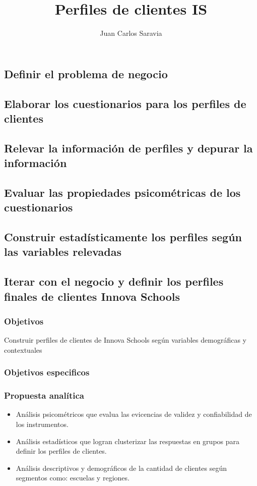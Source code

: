 \documentclass{beamer}
\title{Perfiles de clientes IS}
\author{Juan Carlos Saravia}
\date{}
\begin{document}
\begin{frame}
\titlepage
\end{frame}


\subsection{Definir el problema de negocio}
\subsection{Elaborar los cuestionarios para los perfiles de clientes}
\subsection{Relevar la información de perfiles y depurar la información}
\subsection{Evaluar las propiedades psicométricas de los cuestionarios}
\subsection{Construir estadísticamente los perfiles según las variables relevadas}
\subsection{Iterar con el negocio y definir los perfiles finales de clientes Innova Schools}

\begin{frame}
\frametitle{Objetivos}
Construir perfiles de clientes de Innova Schools según variables demográficas y contextuales
\end{frame}



\begin{frame}
\frametitle{Objetivos especificos}
\tableofcontents
\end{frame}

\begin{frame}
\frametitle{Propuesta analítica}

\begin{itemize}
\item Análisis psicométricos que evalua las evicencias de validez y confiabilidad de los instrumentos.
\item Análisis estadísticos que logran clusterizar las respuestas en grupos para definir los perfiles de clientes.
\item Análisis descriptivos y demográficos de la cantidad de clientes según segmentos como: escuelas y regiones.  
\end{itemize}	

\end{frame}
\end{document}
